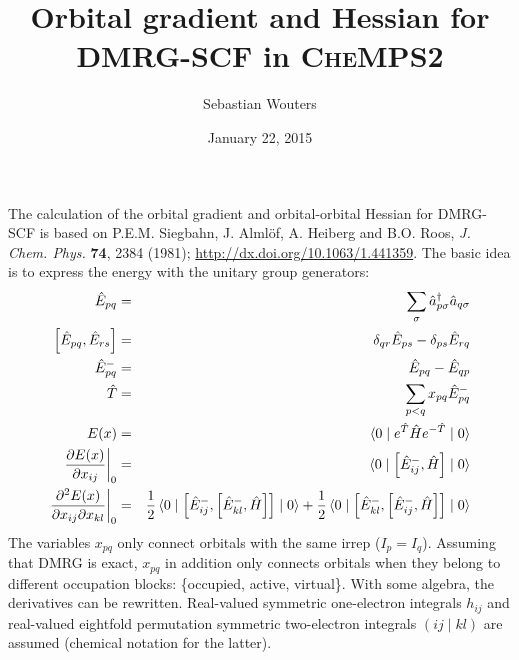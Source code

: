 \documentclass[11pt,a4paper]{article}
\author{Sebastian Wouters}
\title{Orbital gradient and Hessian for DMRG-SCF in \textsc{CheMPS2}}
\date{January 22, 2015}
\begin{document}
\maketitle

The calculation of the orbital gradient and orbital-orbital Hessian for DMRG-SCF is based on P.E.M. Siegbahn, J. Alml\"of, A. Heiberg and B.O. Roos, \textit{J. Chem. Phys.} \textbf{74}, 2384 (1981); \url{http://dx.doi.org/10.1063/1.441359}. The basic idea is to express the energy with the unitary group generators:
\begin{eqnarray}
\hat{E}_{pq} & = & \sum\limits_{\sigma} \hat{a}^{\dagger}_{p \sigma} \hat{a}_{q \sigma} \\
\left[ \hat{E}_{pq} , \hat{E}_{rs} \right] & = & \delta_{qr} \hat{E}_{ps} - \delta_{ps} \hat{E}_{rq} \\
\hat{E}^{-}_{pq} & = & \hat{E}_{pq} - \hat{E}_{qp} \\
\hat{T} & = & \sum\limits_{p<q} x_{pq} \hat{E}^{-}_{pq} \\
E(x) & = & \braket{0 \mid e^{\hat{T}} \hat{H} e^{-\hat{T}} \mid 0 } \\
\left. \frac{\partial E(x)}{\partial x_{ij}} \right|_{0} & = & \braket{ 0 \mid \left[ \hat{E}_{ij}^{-}, \hat{H} \right] \mid 0 } \\
\left. \frac{\partial^2 E(x)}{\partial x_{ij} \partial x_{kl}} \right|_{0} & = & \frac{1}{2} \braket{ 0 \mid  \left[ \hat{E}_{ij}^{-}, \left[ \hat{E}_{kl}^{-}, \hat{H} \right] \right] \mid 0 } + \frac{1}{2} \braket{ 0 \mid  \left[ \hat{E}_{kl}^{-}, \left[ \hat{E}_{ij}^{-}, \hat{H} \right] \right] \mid 0 }
\end{eqnarray}
The variables $x_{pq}$ only connect orbitals with the same irrep ($I_p=I_q$). Assuming that DMRG is exact, $x_{pq}$ in addition only connects orbitals when they belong to different occupation blocks: \{occupied, active, virtual\}. With some algebra, the derivatives can be rewritten. Real-valued symmetric one-electron integrals $h_{ij}$ and real-valued eightfold permutation symmetric two-electron integrals $(ij \mid kl)$ are assumed (chemical notation for the latter).
\end{document}
